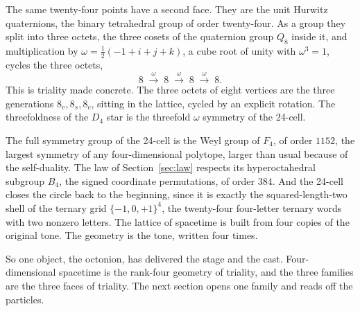 The same twenty-four points have a second face. They are the unit Hurwitz quaternions, the binary tetrahedral group of
order twenty-four. As a group they split into three octets, the three cosets of the quaternion group $Q_8$ inside it,
and multiplication by $\omega = \tfrac12(-1 + i + j + k)$, a cube root of unity with $\omega^3 = 1$, cycles the three
octets,
\begin{equation}
  8 \;\xrightarrow{\ \omega\ }\; 8 \;\xrightarrow{\ \omega\ }\; 8 \;\xrightarrow{\ \omega\ }\; 8 .
\end{equation}
This is triality made concrete. The three octets of eight vertices are the three generations $8_v, 8_s, 8_c$, sitting
in the lattice, cycled by an explicit rotation. The threefoldness of the $D_4$ star is the threefold $\omega$ symmetry
of the 24-cell.

The full symmetry group of the 24-cell is the Weyl group of $F_4$, of order $1152$, the largest symmetry of any
four-dimensional polytope, larger than usual because of the self-duality. The law of Section~\ref{sec:law} respects its
hyperoctahedral subgroup $B_4$, the signed coordinate permutations, of order $384$. And the 24-cell closes the circle
back to the beginning, since it is exactly the squared-length-two shell of the ternary grid $\{-1, 0, +1\}^4$, the
twenty-four four-letter ternary words with two nonzero letters. The lattice of spacetime is built from four copies of
the original tone. The geometry is the tone, written four times.

So one object, the octonion, has delivered the stage and the cast. Four-dimensional spacetime is the rank-four
geometry of triality, and the three families are the three faces of triality. The next section opens one family and
reads off the particles.
